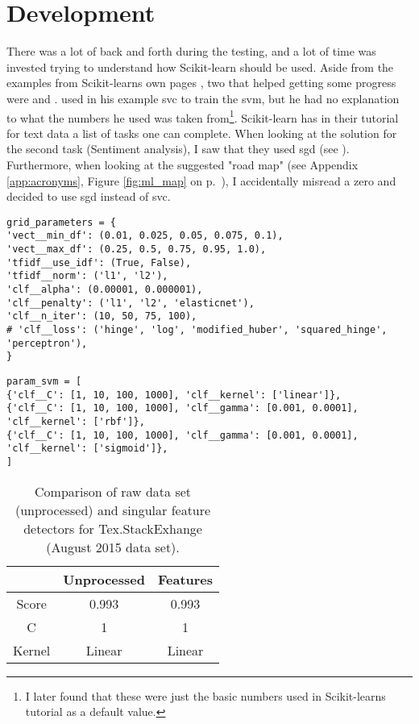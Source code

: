 \section{Development}
\label{sec:development}
There was a lot of back and forth during the testing, and a lot of time was invested trying to understand how Scikit-learn should be used. 
Aside from the examples from Scikit-learns own pages \cite{Scikitlearn.org2016,Scikitlearn.org2016h}, two that helped getting some progress were \cite{Rehurek2014} and \cite{Elahi2016}.
\textcite{Rehurek2014} used in his example \gls{svc} to train the \gls{svm}, but he had no explanation to what the numbers he used was taken from\footnote{
	I later found that these were just the basic numbers used in Scikit-learns tutorial as a default value.
}.
Scikit-learn has in their tutorial for text data \cite{Scikitlearn.org2016h} a list of tasks one can complete. 
When looking at the solution for the second task (Sentiment analysis), I saw that they used \gls{sgd} (see \cite{Scikitlearn.org2016f}).
Furthermore, when looking at the suggested "road map" (see Appendix \ref{app:acronyms}, Figure \ref{fig:ml_map} on p.~\pageref{app:acronyms}), 
I accidentally misread a zero and decided to use \gls{sgd} instead of \gls{svc}.






\begin{lstlisting}[caption={Parameters for SGD}, label={lst:param_sgd}] 
grid_parameters = {
'vect__min_df': (0.01, 0.025, 0.05, 0.075, 0.1),
'vect__max_df': (0.25, 0.5, 0.75, 0.95, 1.0),
'tfidf__use_idf': (True, False),
'tfidf__norm': ('l1', 'l2'),
'clf__alpha': (0.00001, 0.000001),
'clf__penalty': ('l1', 'l2', 'elasticnet'),
'clf__n_iter': (10, 50, 75, 100),
# 'clf__loss': ('hinge', 'log', 'modified_huber', 'squared_hinge', 'perceptron'),
}
\end{lstlisting}


\begin{lstlisting}[caption={Parameters for SVC}, label={lst:param_svc}] 
param_svm = [
{'clf__C': [1, 10, 100, 1000], 'clf__kernel': ['linear']},
{'clf__C': [1, 10, 100, 1000], 'clf__gamma': [0.001, 0.0001], 'clf__kernel': ['rbf']},
{'clf__C': [1, 10, 100, 1000], 'clf__gamma': [0.001, 0.0001], 'clf__kernel': ['sigmoid']},
]
\end{lstlisting}

\begin{table}[!h]%
	\centering
	\begin{tabular}{| c | c | c |}
		\hline
		~ 			& Unprocessed		& Features	\\ \hline
		Score 		& 0.993				& 0.993		\\ \hline
		C			& 1					& 1			\\ \hline
		Kernel		& Linear			& Linear	\\ \hline
	\end{tabular}
	\caption{Comparison of raw data set (unprocessed) and singular feature detectors for Tex.StackExhange (August 2015 data set).}
	\label{tab:singular_feature_detector_tex}
\end{table}


